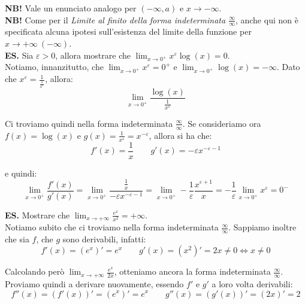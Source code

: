 \documentclass{article}
\begin{document}
\noindent\textbf{NB!} Vale un enunciato analogo per $(-\infty, a)$ e $x \to -\infty$.\\

\noindent\textbf{NB!} Come per il \textit{Limite al finito della forma indeterminata $\frac{\infty}{\infty}$}, anche qui non è specificata alcuna ipotesi sull'esistenza del limite della funzione per $x \to +\infty \ (-\infty)$.\\

\noindent\textbf{ES.} Sia $\varepsilon > 0$, allora mostrare che $\lim_{x \to 0^+} x^\varepsilon\log(x) = 0$. \\
Notiamo, innanzitutto, che $\lim_{x \to 0^+} x^\varepsilon = 0^+$ e $\lim_{x \to 0^+} \log(x) = -\infty$. Dato che $x^\varepsilon = \frac{1}{\frac{1}{x^\varepsilon}}$, allora:
\begin{equation*}
    \lim_{x \to 0^+} \frac{\log(x)}{\frac{1}{x^\varepsilon}}
\end{equation*}

\noindent Ci troviamo quindi nella forma indeterminata $\frac{\infty}{\infty}$. Se consideriamo ora $f(x) = \log(x)$ e $g(x) = \frac{1}{x^\varepsilon} = x^{-\varepsilon}$, allora si ha che:
\begin{equation*}
    f'(x) = \frac{1}{x} \qquad g'(x) = -\varepsilon x^{-\varepsilon - 1}
\end{equation*}

\noindent e quindi:
\begin{equation*}
    \lim_{x \to 0^+} \frac{f'(x)}{g'(x)} = \lim_{x \to 0^+} \frac{\frac{1}{x}}{-\varepsilon x^{-\varepsilon - 1}} = \lim_{x \to 0^+} -\frac{1}{\varepsilon} \frac{x^{\varepsilon + 1}}{x} = -\frac{1}{\varepsilon} \lim_{x \to 0^+} x^\varepsilon = 0^-
\end{equation*}

\noindent\textbf{ES.} Mostrare che $\lim_{x \to +\infty} \frac{e^x}{x^2} = +\infty$.\\
Notiamo subito che ci troviamo nella forma indeterminata $\frac{\infty}{\infty}$. Sappiamo inoltre che sia $f$, che $g$ sono derivabili, infatti:
\begin{equation*}
    f'(x) = (e^x)' = e^x \qquad g'(x) = (x^2)' = 2x \neq 0 \iff x \neq 0
\end{equation*}

\noindent Calcolando però $\lim_{x \to +\infty} \frac{e^x}{2x}$, otteniamo ancora la forma indeterminata $\frac{\infty}{\infty}$. Proviamo quindi a derivare nuovamente, essendo $f'$ e $g'$ a loro volta derivabili:
\begin{equation*}
    f''(x) = (f'(x))' = (e^x)' = e^x \qquad g''(x) = (g'(x))' = (2x)' = 2
\end{equation*}
\end{document}

